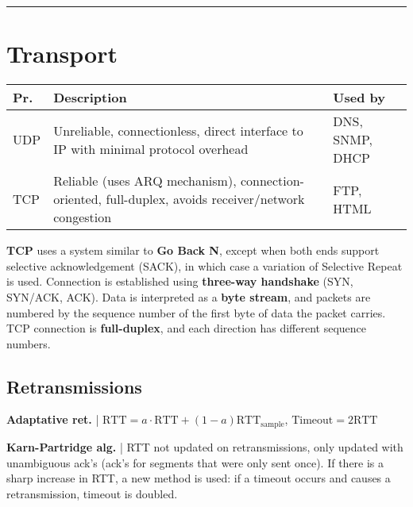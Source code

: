 \documentclass{form}
\begin{document}
\vspace{-0.5em}\noindent\rule{\textwidth}{1.0pt}\vspace{-0.0em}

\noindent
\begin{minipage}[c]{0.60\textwidth}

    \section*{Transport}
    \begin{tabular}{@{}l | p{82mm} | p{20mm}@{}}
        \textbf{Pr.} & \textbf{Description} & \textbf{Used by} \\ \hline \hline
        UDP & Unreliable, connectionless, direct interface to IP with minimal protocol overhead & DNS, SNMP, DHCP\\ \hline
        TCP & Reliable (uses ARQ mechanism), connection-oriented, full-duplex, avoids receiver/network congestion & FTP, HTML
    \end{tabular}

    \textbf{TCP} uses a system similar to \textbf{Go Back N}, except when both ends support selective acknowledgement (SACK), in which case a variation of Selective Repeat is used. Connection is established using \textbf{three-way handshake} (SYN, SYN/ACK, ACK). Data is interpreted as a \textbf{byte stream}, and packets are numbered by the sequence number of the first byte of data the packet carries. TCP connection is \textbf{full-duplex}, and each direction has different sequence numbers.

    \subsection*{Retransmissions}

    \textbf{Adaptative ret.} | 
    $\text{RTT}=a \cdot \text{RTT} + (1-a) \text{RTT}_{\text{sample}}$, $\text{Timeout}=2\text{RTT}$

    \textbf{Karn-Partridge alg.} | 
    RTT not updated on retransmissions, only updated with unambiguous ack's (ack's for segments that were only sent once). If there is a sharp increase in RTT, a new method is used: if a timeout occurs and causes a retransmission, timeout is doubled.
\end{minipage}
\end{document}
